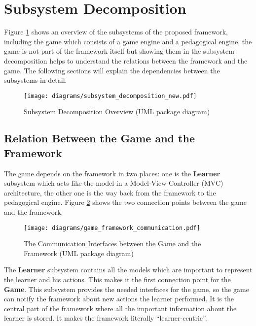 \section{Subsystem Decomposition}
Figure \ref{subsystem_decomp} shows an overview of the subsystems of the
proposed framework, including the game which consists of a game engine and a
pedagogical engine, the game is not part of the framework itself but showing
them in the subsystem decomposition helps to understand the relations between the framework and the game.
The following sections will explain the dependencies between the subsystems in
detail.

\begin{figure}
    \centering
    \texttt{[image: diagrams/subsystem\_decomposition\_new.pdf]}
    \caption[Subsystem Decomposition Overview (UML package diagram)]
    {Subsystem Decomposition Overview (UML package diagram)}
    \label{subsystem_decomp}
\end{figure}

\subsection{Relation Between the Game and the Framework}
The game depends on the framework in two places: one is the \textbf{Learner}
subsystem which acts like the model in a Model-View-Controller (MVC)
architecture, the other one is the way back from the framework to the
pedagogical engine. Figure \ref{game_framework} shows the two connection points
between the game and the framework.

\begin{figure}
    \centering
    \texttt{[image: diagrams/game\_framework\_communication.pdf]}
    \caption[The Communication Interfaces between the Game and the Framework (UML package diagram)]
    {The Communication Interfaces between the Game and the Framework (UML package diagram)}
    \label{game_framework}
\end{figure}

The \textbf{Learner} subsystem contains all the models which are important to
represent the learner and his actions. This makes it the first connection point
for the \textbf{Game}. This subsystem provides the needed interfaces for the game,
so the game can notify the framework about new actions the learner performed. It
is the central part of the framework where all the important information about the learner is
stored. It makes the framework literally ``learner-centric''.

